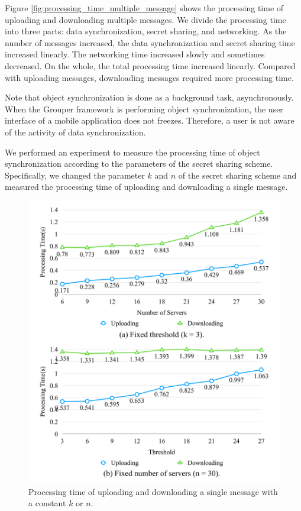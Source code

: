 \documentclass[a4paper,11pt]{report}
\begin{document}
Figure \ref{fig:processing_time_multiple_message} shows the processing time of uploading and downloading multiple messages.
We divide the processing time into three parts: data synchronization, secret sharing, and networking.
As the number of messages increased, the data synchronization and secret sharing time increased linearly. 
The networking time increased slowly and sometimes decreased.
On the whole, the total processing time increased linearly.
Compared with uploading messages, downloading messages required more processing time.

Note that object synchronization is done as a background task, asynchronously.
When the Grouper framework is performing object synchronization, the user interface of a mobile application does not freezes.
Therefore, a user is not aware of the activity of data synchronization.

We performed an experiment to measure the processing time of object synchronization according to the parameters of the secret sharing scheme.
Specifically, we changed the parameter ${k}$ and ${n}$ of the secret sharing scheme and measured the processing time of uploading and downloading a single message.

\begin{figure}[t]
	\centering
	\includegraphics[scale=0.15]{constant_k_n}
	\caption{Processing time of uploading and downloading a single message with a constant ${k}$ or ${n}$.}
	\label{fig:processing_time_constant_k_n}
\end{figure}
\end{document}
